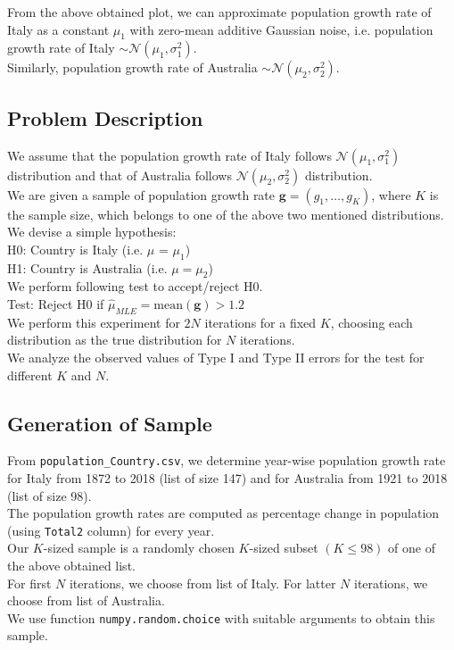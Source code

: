 \documentclass[fleqn, 11pt]{article}
\begin{document}
From the above obtained plot, we can approximate population growth rate of Italy as a constant $\mu_1$ with zero-mean additive Gaussian noise, i.e. population growth rate of Italy $\sim \mathcal{N}(\mu_1, \sigma_1^2)$. \\
Similarly, population growth rate of Australia $\sim \mathcal{N}(\mu_2, \sigma_2^2)$.

\subsection{Problem Description}
We assume that the population growth rate of Italy follows $\mathcal{N}(\mu_1, \sigma_1^2)$ distribution and that of Australia follows $\mathcal{N}(\mu_2, \sigma_2^2)$ distribution. \\
We are given a sample of population growth rate $\mathbf{g} = (g_1, \dots, g_K)$, where $K$ is the sample size, which belongs to one of the above two mentioned distributions. \\
We devise a simple hypothesis: \\
H0: Country is Italy (i.e. $\mu$ = $\mu_1$) \\
H1: Country is Australia (i.e. $\mu = \mu_2$) \\
We perform following test to accept/reject H0. \\
Test: Reject H0 if $\hat{\mu}_{MLE} = \mathrm{mean}(\mathbf{g}) > 1.2$ \\
We perform this experiment for $2N$ iterations for a fixed $K$, choosing each distribution as the true distribution for $N$ iterations. \\
We analyze the observed values of Type I and Type II errors for the test for different $K$ and $N$.

\subsection{Generation of Sample}
From \verb!population_Country.csv!, we determine year-wise population growth rate for Italy from 1872 to 2018 (list of size 147) and for Australia from 1921 to 2018 (list of size 98). \\
The population growth rates are computed as percentage change in population (using \verb!Total2! column) for every year. \\
Our $K$-sized sample is a randomly chosen $K$-sized subset $(K \le 98)$ of one of the above obtained list. \\
For first $N$ iterations, we choose from list of Italy. For latter $N$ iterations, we choose from list of Australia. \\
We use function \verb!numpy.random.choice! with suitable arguments to obtain this sample. \\
\end{document}
